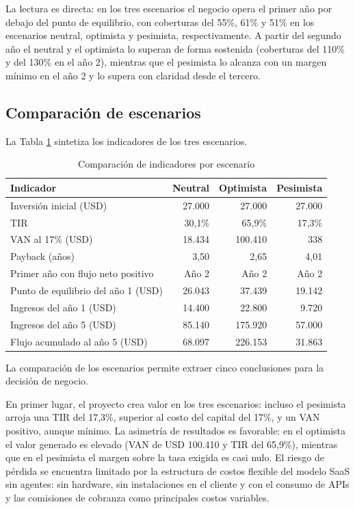 La lectura es directa: en los tres escenarios el negocio opera el primer año por debajo del punto de equilibrio, con coberturas del 55\%, 61\% y 51\% en los escenarios neutral, optimista y pesimista, respectivamente. A partir del segundo año el neutral y el optimista lo superan de forma sostenida (coberturas del 110\% y del 130\% en el año 2), mientras que el pesimista lo alcanza con un margen mínimo en el año 2 y lo supera con claridad desde el tercero.

\subsection{Comparación de escenarios}

La Tabla \ref{tab:comparacion-escenarios} sintetiza los indicadores de los tres escenarios.

\begin{table}[H]
\centering
\begin{tabular}{l r r r}
\hline
Indicador & Neutral & Optimista & Pesimista \\
\hline
Inversión inicial (USD) & 27.000 & 27.000 & 27.000 \\
TIR & 30,1\% & 65,9\% & 17,3\% \\
VAN al 17\% (USD) & 18.434 & 100.410 & 338 \\
Payback (años) & 3,50 & 2,65 & 4,01 \\
Primer año con flujo neto positivo & Año 2 & Año 2 & Año 2 \\
Punto de equilibrio del año 1 (USD) & 26.043 & 37.439 & 19.142 \\
Ingresos del año 1 (USD) & 14.400 & 22.800 & 9.720 \\
Ingresos del año 5 (USD) & 85.140 & 175.920 & 57.000 \\
Flujo acumulado al año 5 (USD) & 68.097 & 226.153 & 31.863 \\
\hline
\end{tabular}
\caption{Comparación de indicadores por escenario}
\label{tab:comparacion-escenarios}
\end{table}

La comparación de los escenarios permite extraer cinco conclusiones para la decisión de negocio.

En primer lugar, el proyecto crea valor en los tres escenarios: incluso el pesimista arroja una TIR del 17,3\%, superior al costo del capital del 17\%, y un VAN positivo, aunque mínimo. La asimetría de resultados es favorable: en el optimista el valor generado es elevado (VAN de USD 100.410 y TIR del 65,9\%), mientras que en el pesimista el margen sobre la tasa exigida es casi nulo. El riesgo de pérdida se encuentra limitado por la estructura de costos flexible del modelo SaaS sin agentes: sin hardware, sin instalaciones en el cliente y con el consumo de APIs y las comisiones de cobranza como principales costos variables.

